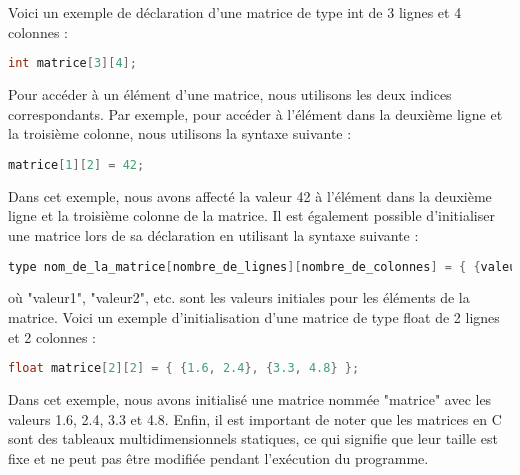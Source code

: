 \documentclass{uofa-eng-assignment}
\begin{document}
\noindent \newline
Voici un exemple de déclaration d'une matrice de type int de 3 lignes et 4 colonnes :

\begin{lstlisting}[language=c]
int matrice[3][4];
\end{lstlisting}

Pour accéder à un élément d'une matrice, nous utilisons les deux indices correspondants. Par exemple, pour accéder à l'élément dans la deuxième ligne et la troisième colonne, nous utilisons la syntaxe suivante :

\begin{lstlisting}[language=c]
matrice[1][2] = 42;
\end{lstlisting}

\noindent \newline
Dans cet exemple, nous avons affecté la valeur 42 à l'élément dans la deuxième ligne et la troisième colonne de la matrice.
\newline \newline
Il est également possible d'initialiser une matrice lors de sa déclaration en utilisant la syntaxe suivante :

\begin{lstlisting}[language=c]
type nom_de_la_matrice[nombre_de_lignes][nombre_de_colonnes] = { {valeur1, valeur2, ...}, {valeur1, valeur2, ...}, ... };
\end{lstlisting}

\noindent \newline
où "valeur1", "valeur2", etc. sont les valeurs initiales pour les éléments de la matrice.
\newline \newline
Voici un exemple d'initialisation d'une matrice de type float de 2 lignes et 2 colonnes :

\begin{lstlisting}[language=c]
float matrice[2][2] = { {1.6, 2.4}, {3.3, 4.8} };
\end{lstlisting}

\noindent \newline
Dans cet exemple, nous avons initialisé une matrice nommée "matrice" avec les valeurs 1.6, 2.4, 3.3 et 4.8.
\newline \newline
Enfin, il est important de noter que les matrices en C sont des tableaux multidimensionnels statiques, ce qui signifie que leur taille est fixe et ne peut pas être modifiée pendant l'exécution du programme.
\end{document}
